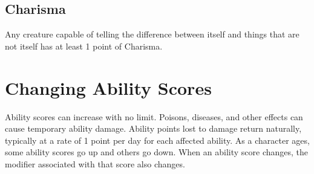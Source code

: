 \subsection{Charisma}

Any creature capable of telling the difference
between itself and things that are not itself has at least 1 point
of Charisma.

\section{Changing Ability Scores}

Ability scores can increase with no
limit.  Poisons, diseases, and other effects can cause temporary ability
damage. Ability points lost to damage return naturally, typically at a
rate of 1 point per day for each affected ability.  As a character ages,
some ability scores go up and others go down.  When an ability score
changes, the modifier associated with that score also changes.

